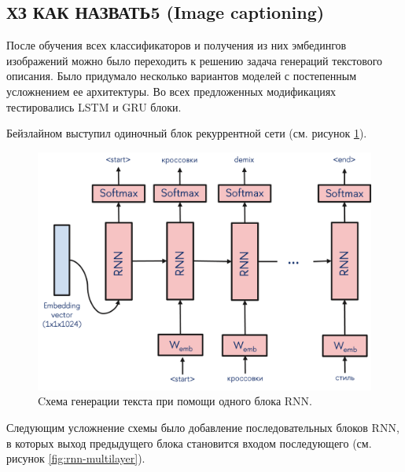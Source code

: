 \documentclass[a4paper,12pt]{extarticle}
\begin{document}
\subsection{ХЗ КАК НАЗВАТЬ5 (Image captioning)}
После обучения всех классификаторов и получения из них эмбедингов изображений можно было переходить к решению задача генераций текстового описания. Было придумало несколько вариантов моделей с постепенным усложнением ее архитектуры. Во всех предложенных модификациях тестировались LSTM и GRU блоки.

Бейзлайном выступил одиночный блок рекуррентной сети (см. рисунок \ref{fig:rnn_one}).
\begin{figure}[ht]
	\centering
	\includegraphics[scale=0.7]{rnn_one.png}
	\caption{Cхема генерации текста при помощи одного блока RNN.}
	\label{fig:rnn_one}
\end{figure}
Следующим усложнение схемы было добавление последовательных блоков RNN, в которых выход предыдущего блока становится входом последующего (см. рисунок \ref{fig:rnn-multilayer}).
\end{document}
